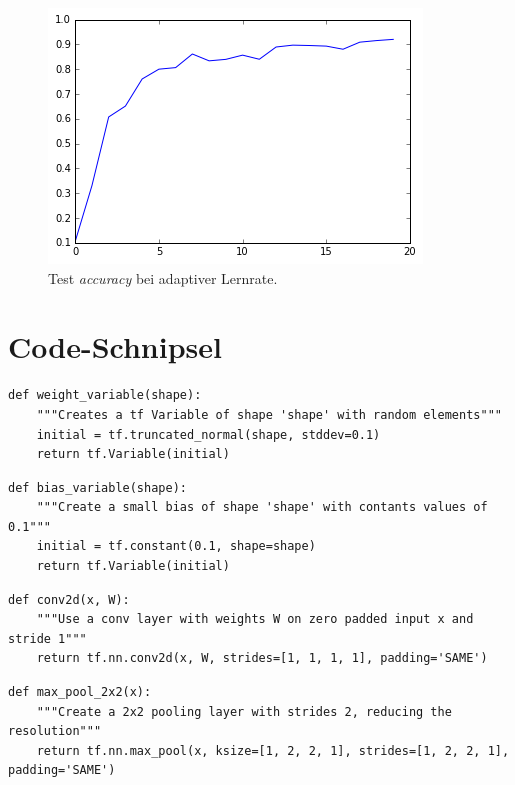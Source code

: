 \documentclass[10pt,journal,compsoc]{IEEEtran}
\begin{document}
\begin{figure}[!h]
\centering
\includegraphics[scale=0.5]{test_accuracy_adapt_rate}
\caption{Test \emph{accuracy} bei adaptiver Lernrate.}
\end{figure}
\newpage
\appendices
\section{Code-Schnipsel}

\begin{lstlisting}[caption={Erzeugt ein Gewichts-Array mit zufällig initialisierten Werten. Die Dimensionen werden als Parameter entegengenommen.}, label=lst1]
def weight_variable(shape):
    """Creates a tf Variable of shape 'shape' with random elements"""
    initial = tf.truncated_normal(shape, stddev=0.1)
    return tf.Variable(initial)
\end{lstlisting}

\begin{lstlisting}[caption={Erzeugt ein bias-Array mit zufällig initialisierten Werten. Die Dimensionen werden als Parameter entegengenommen.}, label=lst2]
def bias_variable(shape):
    """Create a small bias of shape 'shape' with contants values of 0.1"""
    initial = tf.constant(0.1, shape=shape)
    return tf.Variable(initial)
\end{lstlisting}

\begin{lstlisting}[caption={Eine zweidimensionale Faltung mit Eingabe x und Filter W.}, label=lst3]
def conv2d(x, W):
    """Use a conv layer with weights W on zero padded input x and stride 1"""
    return tf.nn.conv2d(x, W, strides=[1, 1, 1, 1], padding='SAME')
\end{lstlisting}

\begin{lstlisting}[caption={Hier wird 2x2 max pooling auf die Eingabe x angewendet.}, label=lst4]
def max_pool_2x2(x):
    """Create a 2x2 pooling layer with strides 2, reducing the resolution"""
    return tf.nn.max_pool(x, ksize=[1, 2, 2, 1], strides=[1, 2, 2, 1], padding='SAME')
\end{lstlisting}
\end{document}
